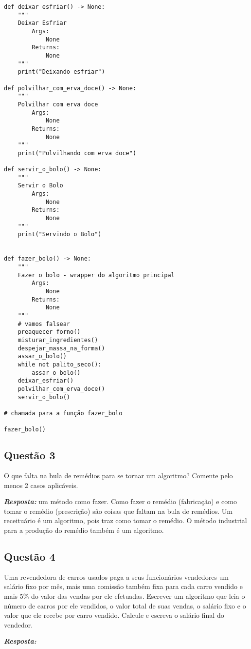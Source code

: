 \documentclass[a4paper, 12pt, onecolumn,singlespacing]{article}
\begin{document}
\begin{verbatim}
def deixar_esfriar() -> None:
	"""
	Deixar Esfriar
		Args:
			None
		Returns:
			None
	"""
	print("Deixando esfriar")

def polvilhar_com_erva_doce() -> None:
	"""
	Polvilhar com erva doce
		Args:
			None
		Returns:
			None
	"""
	print("Polvilhando com erva doce")

def servir_o_bolo() -> None:
	"""
	Servir o Bolo
		Args:
			None
		Returns:
			None
	"""
	print("Servindo o Bolo")


def fazer_bolo() -> None:
	"""
	Fazer o bolo - wrapper do algoritmo principal
		Args:
			None
		Returns:
			None
	"""
	# vamos falsear
	preaquecer_forno()
	misturar_ingredientes()
	despejar_massa_na_forma()
	assar_o_bolo()
	while not palito_seco():
		assar_o_bolo()
	deixar_esfriar()
	polvilhar_com_erva_doce()
	servir_o_bolo()

# chamada para a função fazer_bolo

fazer_bolo()

\end{verbatim}

\subsection{Questão 3}

O que falta na bula de remédios para se tornar um algoritmo? Comente pelo menos 2 casos aplicáveis.

\textbf{\textit{Resposta:}} um método como fazer. Como fazer o remédio (fabricação) e como tomar o remédio (prescrição) são coisas que faltam na bula de remédios. Um receituário é um algoritmo, pois traz como tomar o remédio. O método industrial para a produção do remédio também é um algoritmo.

\subsection{Questão 4}

Uma revendedora de carros usados paga a seus funcionários vendedores um salário fixo por mês,	mais uma comissão também fixa para cada carro vendido e mais 5\% do valor das vendas por ele	efetuadas. Escrever um algoritmo que leia o número de carros por ele vendidos, o valor total de suas vendas, o salário fixo e o valor que ele recebe por carro vendido. Calcule e escreva o salário final do vendedor.

\textbf{\textit{Resposta:}}
\end{document}
